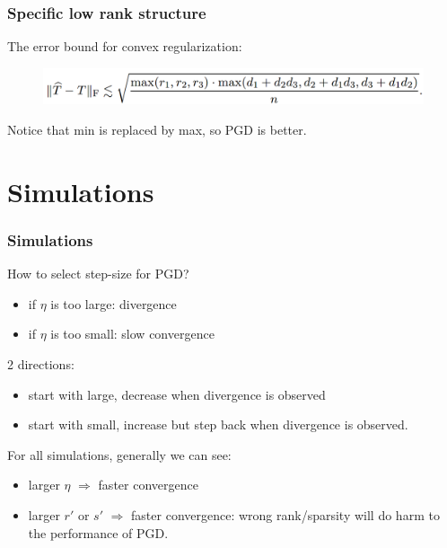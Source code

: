 \documentclass{beamer}
\begin{document}
	
	\begin{frame}
		\frametitle{Specific low rank structure}
		The error bound for convex regularization:
		\begin{figure}
			\includegraphics[width=.7\linewidth]{image031.png}
		\end{figure}
		Notice that min is replaced by max, so PGD is better.
	\end{frame}
	
	\section{Simulations}
	
	\begin{frame}
		\frametitle{Simulations}
		How to select step-size for PGD?
		\begin{itemize}
			\item 
			if $\eta$ is too large: divergence
			\item
			if $\eta$ is too small: slow convergence
		\end{itemize}
		2 directions:
		\begin{itemize}
			\item 
			start with large, decrease when divergence is observed
			\item
			start with small, increase but step back when divergence is observed.
		\end{itemize}
		
		For all simulations, generally we can see:
		\begin{itemize}
			\item 
			larger $\eta$ $\Rightarrow$ faster convergence
			\item
			larger $r'$ or $s'$ $\Rightarrow$ faster convergence: wrong rank/sparsity will do harm to the performance of PGD.
		\end{itemize}
	\end{frame}
	
\end{document}
